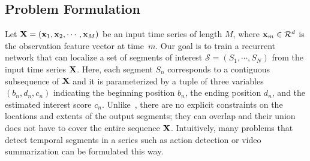 \documentclass[10pt,journal,compsoc]{IEEEtran}
\begin{document}
\subsection{Problem Formulation}
Let ${\bf X} = (\mathbf{x}_1, \mathbf{x}_2, \cdots, \mathbf{x}_M) $ be an input time series of length $M$, where ${\bf x}_m \in \mathcal{R}^d$ is the observation feature vector at time~$m$.  Our goal is to train a recurrent network that can localize a set of segments of interest $\mathcal{S}=(S_1,\cdots, S_N)$ from the input time series ${\bf X}$. Here, each segment $S_n$ corresponds to a contiguous subsequence of ${\bf X}$ and it is parameterized by a tuple of three variables $(b_n, d_n, c_n)$ indicating the beginning position $b_n$, the ending position $d_n$, and the estimated interest score $c_n$. Unlike~\cite{adi2017sequence,namikawa2008model}, there are no explicit constraints on the locations and extents of the output segments; they can overlap and their union does not have to cover the entire sequence ${\bf X}$. Intuitively, many problems that detect temporal segments in a series such as action detection or video summarization can be formulated this way. 

\end{document}
